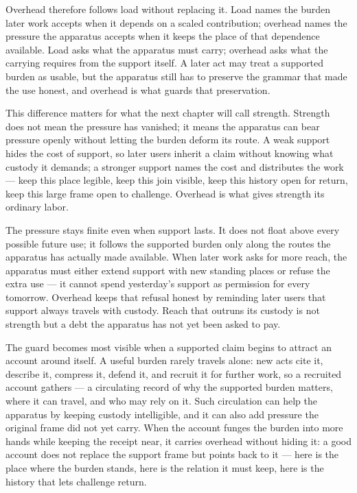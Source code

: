 Overhead therefore follows load without replacing it. Load names the burden later work accepts when it depends on a scaled contribution; overhead names the pressure the apparatus accepts when it keeps the place of that dependence available. Load asks what the apparatus must carry; overhead asks what the carrying requires from the support itself. A later act may treat a supported burden as usable, but the apparatus still has to preserve the grammar that made the use honest, and overhead is what guards that preservation.

This difference matters for what the next chapter will call strength. Strength does not mean the pressure has vanished; it means the apparatus can bear pressure openly without letting the burden deform its route. A weak support hides the cost of support, so later users inherit a claim without knowing what custody it demands; a stronger support names the cost and distributes the work --- keep this place legible, keep this join visible, keep this history open for return, keep this large frame open to challenge. Overhead is what gives strength its ordinary labor.

The pressure stays finite even when support lasts. It does not float above every possible future use; it follows the supported burden only along the routes the apparatus has actually made available. When later work asks for more reach, the apparatus must either extend support with new standing places or refuse the extra use --- it cannot spend yesterday's support as permission for every tomorrow. Overhead keeps that refusal honest by reminding later users that support always travels with custody. Reach that outruns its custody is not strength but a debt the apparatus has not yet been asked to pay.

The guard becomes most visible when a supported claim begins to attract an account around itself. A useful burden rarely travels alone: new acts cite it, describe it, compress it, defend it, and recruit it for further work, so a recruited account gathers --- a circulating record of why the supported burden matters, where it can travel, and who may rely on it. Such circulation can help the apparatus by keeping custody intelligible, and it can also add pressure the original frame did not yet carry. When the account funges the burden into more hands while keeping the receipt near, it carries overhead without hiding it: a good account does not replace the support frame but points back to it --- here is the place where the burden stands, here is the relation it must keep, here is the history that lets challenge return.

